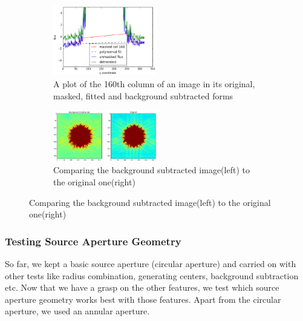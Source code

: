 \documentclass[conference]{IEEEtran}
\begin{document}
        \begin{figure}[H]
            \centering
            \begin{subfigure}{1}
                \includegraphics[width = 0.5\textwidth]{col_plot}
                \caption{A plot of the 160th column of an image in its original, masked, fitted and background subtracted forms}
            \end{subfigure}
        
            \begin{subfigure}{2}
                \includegraphics[width = 0.5\textwidth]{col_image}
                \caption{Comparing the background subtracted image(left) to the original one(right)}
            \end{subfigure}
        \end{figure}
        
        
        \subsubsection{Testing Source Aperture Geometry}
        So far, we kept a basic source aperture (circular aperture) and carried on with other tests like radius combination, generating centers, background subtraction etc. Now that we have a grasp on the other features, we test which source aperture geometry works best with those features. Apart from the circular aperture, we used an annular aperture. 
        
\end{document}
